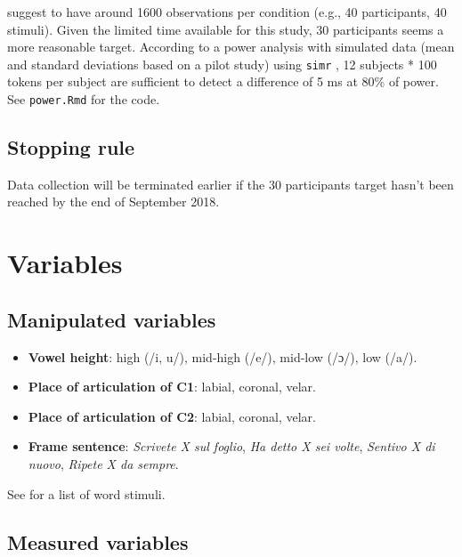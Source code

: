 \documentclass[11pt,]{article}
\providecommand{\tightlist}{%
  \setlength{\itemsep}{0pt}\setlength{\parskip}{0pt}}
\begin{document}
\citet{brysbaert2018} suggest to have around 1600 observations per
condition (e.g., 40 participants, 40 stimuli). Given the limited time
available for this study, 30 participants seems a more reasonable
target. According to a power analysis with simulated data (mean and
standard deviations based on a pilot study) using \texttt{simr}
\citep{green2016}, 12 subjects * 100 tokens per subject are sufficient
to detect a difference of 5 ms at 80\% of power. See \texttt{power.Rmd}
for the code.

\hypertarget{stopping-rule}{%
\subsection{Stopping rule}\label{stopping-rule}}

Data collection will be terminated earlier if the 30 participants target
hasn't been reached by the end of September 2018.

\hypertarget{variables}{%
\section{Variables}\label{variables}}

\hypertarget{manipulated-variables}{%
\subsection{Manipulated variables}\label{manipulated-variables}}

\label{s:manipulated}

\begin{itemize}
\tightlist
\item
  \textbf{Vowel height}: high (/i, u/), mid-high (/e/), mid-low (/ɔ/),
  low (/a/).
\item
  \textbf{Place of articulation of C1}: labial, coronal, velar.
\item
  \textbf{Place of articulation of C2}: labial, coronal, velar.
\item
  \textbf{Frame sentence}: \emph{Scrivete X sul foglio}, \emph{Ha detto
  X sei volte}, \emph{Sentivo X di nuovo}, \emph{Ripete X da sempre}.
\end{itemize}

See  for a list of word stimuli.

\hypertarget{measured-variables}{%
\subsection{Measured variables}\label{measured-variables}}
\end{document}
